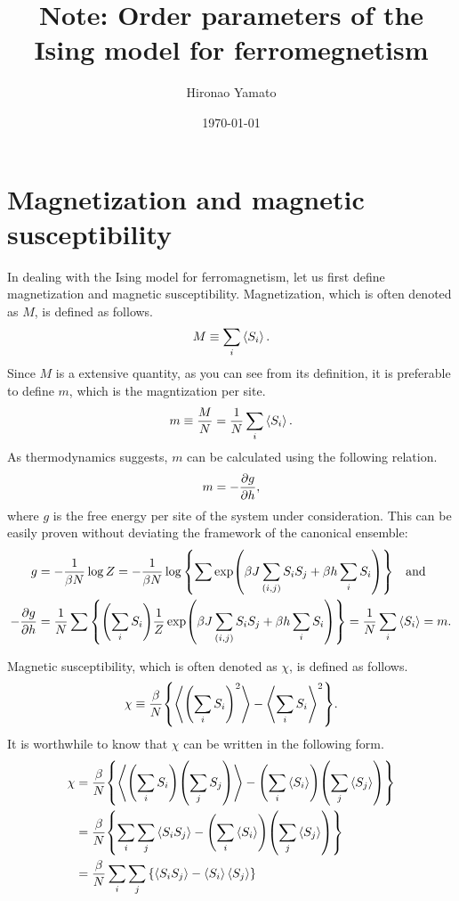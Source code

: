\documentclass[aps, 12pt]{revtex4-2}
\begin{document}
\title{Note: Order parameters of the Ising model for ferromegnetism}
\author{Hironao Yamato}
\date{\today}
\maketitle

\section{Magnetization and magnetic susceptibility}
In dealing with the Ising model for ferromagnetism, let us first define magnetization and magnetic susceptibility. Magnetization, which is often denoted as $M$, is defined as follows.
\begin{align}
  M \equiv \sum_{i} \ev{S_i}.
\end{align}
Since $M$ is a extensive quantity, as you can see from its definition, it is preferable to define $m$, which is the magntization per site.
\begin{align}
  m \equiv \frac{M}{N} = \frac{1}{N} \sum_i \ev{S_i}.
\end{align}
As thermodynamics suggests, $m$ can be calculated using the following relation.
\begin{align}
  m = -\pdv{g}{h},
\end{align}
where $g$ is the free energy per site of the system under consideration. This can be easily proven without deviating the framework of the canonical ensemble:
\begin{align}
  g &= -\frac{1}{\beta N} \log Z = -\frac{1}{\beta N} \log \qty{ \sum \exp(\beta J \sum_{(i, j)}S_iS_j + \beta h \sum_i S_i)} \quad \text{and}\\
  - \pdv{g}{h} &= \frac{1}{N} \sum \qty{\qty(\sum_i S_i)\frac{1}{Z}\exp(\beta J \sum_{(i, j)}S_iS_j + \beta h \sum_i S_i)} = \frac{1}{N} \sum_i \ev{S_i} = m.
\end{align}

Magnetic susceptibility, which is often denoted as $\chi$, is defined as follows.
\begin{align}
  \chi \equiv \frac{\beta}{N}\qty{\ev{\qty(\sum_iS_i)^2} - \ev{\sum_iS_i}^2}.
\end{align}
It is worthwhile to know that $\chi$ can be written in the following form.
\begin{align}
  \chi &= \frac{\beta}{N}\qty{\ev{\qty(\sum_i S_i)\qty(\sum_j S_j)} - \qty(\sum_i\ev{S_i})\qty(\sum_j\ev{S_j})} \\
  &= \frac{\beta}{N}\qty{\sum_i\sum_j \ev{S_iS_j} - \qty(\sum_i\ev{S_i})\qty(\sum_j\ev{S_j})} \\
  &= \frac{\beta}{N}\sum_i\sum_j \qty{\ev{S_iS_j} - \ev{S_i}\ev{S_j}}
\end{align}

\end{document}
